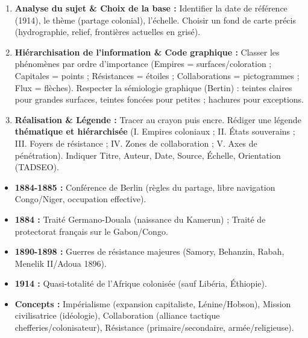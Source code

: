 \documentclass[11pt]{article}
\newcommand{\cle}[1]{{\popxbold\color{popdark}#1}}
\newcounter{popsec}
\newcounter{popsub}
\newcommand{\courssub}[1]{%
  \stepcounter{popsub}%
  \par\vspace{9pt}\noindent{\popxbold\fontsize{11.5}{13}\selectfont\color{popink}{\color{poporange}\thepopsec.\thepopsub}\hspace{6pt}#1}\par\nopagebreak\vspace{4pt}
}
\begin{document}
\courssub{Ressources à mobiliser}
\begin{methode}
    \begin{enumerate}
        \item \textbf{Analyse du sujet \& Choix de la base :} Identifier la date de référence (1914), le thème (partage colonial), l'échelle. Choisir un fond de carte précis (hydrographie, relief, frontières actuelles en grisé).
        \item \textbf{Hiérarchisation de l'information \& Code graphique :} Classer les phénomènes par ordre d'importance (Empires = surfaces/coloration ; Capitales = points ; Résistances = étoiles ; Collaborations = pictogrammes ; Flux = flèches). Respecter la sémiologie graphique (Bertin) : teintes claires pour grandes surfaces, teintes foncées pour petites ; hachures pour exceptions.
        \item \textbf{Réalisation \& Légende :} Tracer au crayon puis encre. Rédiger une légende \textbf{thématique et hiérarchisée} (I. Empires coloniaux ; II. États souverains ; III. Foyers de résistance ; IV. Zones de collaboration ; V. Axes de pénétration). Indiquer Titre, Auteur, Date, Source, Échelle, Orientation (TADSEO).
    \end{enumerate}
\end{methode}

\begin{aretenir}
    \begin{itemize}
        \item \textbf{1884-1885 :} Conférence de Berlin (règles du partage, libre navigation Congo/Niger, occupation effective).
        \item \textbf{1884 :} Traité Germano-Douala (naissance du Kamerun) ; Traité de protectorat français sur le Gabon/Congo.
        \item \textbf{1890-1898 :} Guerres de résistance majeures (Samory, Behanzin, Rabah, Menelik II/Adoua 1896).
        \item \textbf{1914 :} Quasi-totalité de l'Afrique colonisée (sauf Libéria, Éthiopie).
        \item \textbf{Concepts :} \cle{Impérialisme} (expansion capitaliste, Lénine/Hobson), \cle{Mission civilisatrice} (idéologie), \cle{Collaboration} (alliance tactique chefferies/colonisateur), \cle{Résistance} (primaire/secondaire, armée/religieuse).
    \end{itemize}
\end{aretenir}
\end{document}
